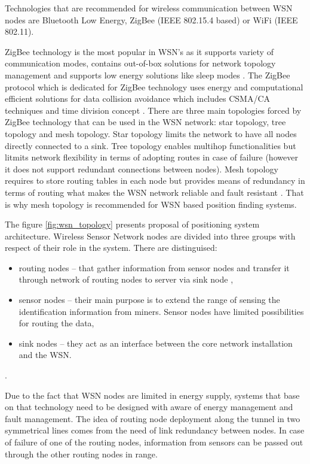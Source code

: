 \documentclass[../main.tex]{subfiles}
\begin{document}
Technologies that are recommended for wireless communication between WSN nodes are Bluetooth Low Energy, ZigBee (IEEE 802.15.4 based) or WiFi (IEEE 802.11).

ZigBee technology is the most popular in WSN's as it supports variety of communication modes, contains out-of-box solutions for network topology management and supports low energy solutions like sleep modes \cite{ZigBee_applications}. The ZigBee protocol which is dedicated for ZigBee technology uses energy and computational efficient solutions for data collision avoidance which includes CSMA/CA techniques and time division concept \cite{WSN_monitoring, ZigBee_desc}. There are three main topologies forced by ZigBee technology that can be used in the WSN network: star topology, tree topology and mesh topology. Star topology limits the network to have all nodes directly connected to a sink. Tree topology enables multihop functionalities but litmits network flexibility in terms of adopting routes in case of failure (however it does not support redundant connections between nodes). Mesh topology requires to store routing tables in each node but provides means of redundancy in terms of routing what makes the WSN network reliable and fault resistant \cite{ZigBee_desc}. That is why mesh topology is recommended for WSN based position finding systems.

The figure \ref{fig:wsn_topology} presents proposal of positioning system architecture. Wireless Sensor Network nodes are divided into three groups with respect of their role in the system. There are distinguised:
\begin{itemize}
	\item routing nodes -- that gather information from sensor nodes and transfer it through network of routing nodes to server via sink node \cite{WSN_monitoring},
	\item sensor nodes -- their main purpose is to extend the range of sensing the identification information from miners. Sensor nodes have limited possibilities for routing the data,
	\item sink nodes -- they act as an interface between the core network installation and the WSN.
\end{itemize}.

Due to the fact that WSN nodes are limited in energy supply, systems that base on that technology need to be designed with aware of energy management and fault management. The idea of routing node deployment along the tunnel in two symmetrical lines comes from the need of link redundancy between nodes. In case of failure of one of the routing nodes, information from sensors can be passed out through the other routing nodes in range.
\end{document}
